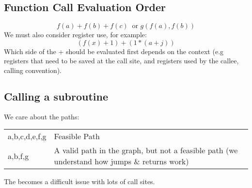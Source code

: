 \documentclass{report}
\begin{document}
        \subsection*{Function Call Evaluation Order}
            \[f(a) + f(b) + f(c) \ \text{ or } g(f(a),f(b))\]
            We must also consider register use, for example:
            \[(f(x) + 1) + (1 * (a + j))\]
            Which side of the $+$ should be evaluated first depends on the context (e.g registers that need to be saved at the call site, and registers used by the callee, calling convention).
        
        \subsection*{Calling a subroutine}
            We care about the  paths:
            \begin{center}
                \begin{tabular}{l l}
                    a,b,c,d,e,f,g & Feasible Path \\
                    a,b,f,g & A valid path in the graph, but not a feasible path (we understand how jumps \& returns work)
                \end{tabular}
            \end{center}
            The  becomes a difficult issue with lots of call sites.
\end{document}
